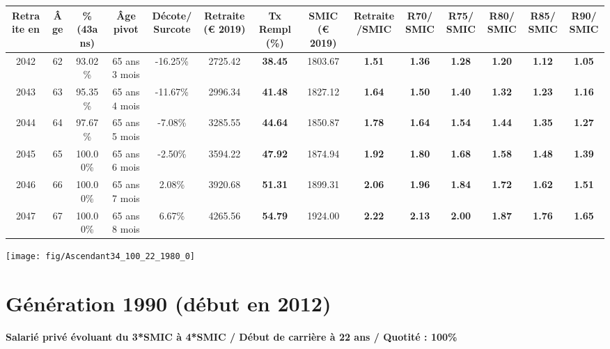 \begin{adjustbox}{max width=\textwidth} 
\begin{tabular}[htb]{|c|c||c|c|c||c|c||c|c||c|c|c|c|c|} 
\hline 
 Retraite en &  Âge &  \%(43ans) &  Âge pivot &  Décote/Surcote &  Retraite (\euro{} 2019) &  Tx Rempl(\%) &  SMIC (\euro{} 2019) &  Retraite/SMIC &  R70/SMIC &  R75/SMIC &  R80/SMIC &  R85/SMIC &  R90/SMIC \\ 
\hline \hline 
 2042 &  62 &  93.02\% &  65 ans 3 mois &  -16.25\% &  2725.42 &  {\bf 38.45} &  1803.67 &  {\bf 1.51} &  {\bf 1.36} &  {\bf 1.28} &  {\bf 1.20} &  {\bf 1.12} &  {\bf 1.05} \\ 
\hline 
 2043 &  63 &  95.35\% &  65 ans 4 mois &  -11.67\% &  2996.34 &  {\bf 41.48} &  1827.12 &  {\bf 1.64} &  {\bf 1.50} &  {\bf 1.40} &  {\bf 1.32} &  {\bf 1.23} &  {\bf 1.16} \\ 
\hline 
 2044 &  64 &  97.67\% &  65 ans 5 mois &  -7.08\% &  3285.55 &  {\bf 44.64} &  1850.87 &  {\bf 1.78} &  {\bf 1.64} &  {\bf 1.54} &  {\bf 1.44} &  {\bf 1.35} &  {\bf 1.27} \\ 
\hline 
 2045 &  65 &  100.00\% &  65 ans 6 mois &  -2.50\% &  3594.22 &  {\bf 47.92} &  1874.94 &  {\bf 1.92} &  {\bf 1.80} &  {\bf 1.68} &  {\bf 1.58} &  {\bf 1.48} &  {\bf 1.39} \\ 
\hline 
 2046 &  66 &  100.00\% &  65 ans 7 mois &  2.08\% &  3920.68 &  {\bf 51.31} &  1899.31 &  {\bf 2.06} &  {\bf 1.96} &  {\bf 1.84} &  {\bf 1.72} &  {\bf 1.62} &  {\bf 1.51} \\ 
\hline 
 2047 &  67 &  100.00\% &  65 ans 8 mois &  6.67\% &  4265.56 &  {\bf 54.79} &  1924.00 &  {\bf 2.22} &  {\bf 2.13} &  {\bf 2.00} &  {\bf 1.87} &  {\bf 1.76} &  {\bf 1.65} \\ 
\hline 
\hline 
\end{tabular} 
\end{adjustbox} 
 
 \vspace{0.1cm} 

 {\hspace{-2.2cm}\texttt{[image: fig/Ascendant34\_100\_22\_1980\_0]}} 

\newpage 
 
\section{Génération 1990 (début en 2012)\label{Ascendant34_100_22_1990_0}} 
 
{\bf \noindent Salarié privé évoluant du 3*SMIC à 4*SMIC / Début de carrière à 22 ans / Quotité : 100\%}  ~ 

